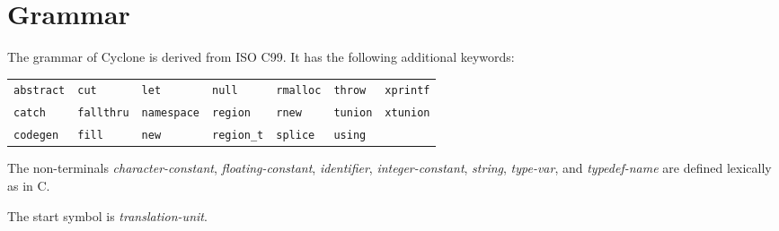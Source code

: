 \section{Grammar}

\newcommand{\rulelabel}[1]{%
  \parbox[b]{\labelwidth}{\makebox[0pt][l]{\hypertarget{#1}{\textit{#1}}:}\\}}
\newenvironment{rules}[1]{%
  \begin{list}{}{}%
    \renewcommand{\makelabel}{\rulelabel}%
  \item[#1]}{\end{list}}
\newcommand{\ruleoneoflabel}[1]{%
  \parbox[b]{\labelwidth}%
  {\makebox[0pt][l]{\hypertarget{#1}{\textit{#1}}: one of}\\}}
\newenvironment{rulesoneof}[1]{%
  \begin{list}{}{}%
    \renewcommand{\makelabel}{\ruleoneoflabel}%
  \item[#1]}{\end{list}}

\newcommand{\nt}[1]{\hyperlink{#1}{\textit{#1}}} %
\newcommand{\tk}[1]{\texttt{#1}}                 %
\newcommand{\opt}{\ensuremath{_{\it\textcolor{bluegray}{opt}}}}

The grammar of Cyclone is derived from ISO C99.
It has the following additional keywords:

\begin{center}
\begin{tabular}{lllllll}
\tk{abstract} &\tk{cut}      &\tk{let}       &\tk{null}     &\tk{rmalloc} &\tk{throw}  &\tk{xprintf}\\
\tk{catch}    &\tk{fallthru} &\tk{namespace} &\tk{region}   &\tk{rnew}    &\tk{tunion} &\tk{xtunion}\\
\tk{codegen}  &\tk{fill}     &\tk{new}       &\tk{region_t} &\tk{splice}  &\tk{using}  
\end{tabular}
\end{center}

The non-terminals
\hypertarget{character-constant}{\textit{character-constant}},
\hypertarget{floating-constant}{\textit{floating-constant}},
\hypertarget{identifier}{\textit{identifier}},
\hypertarget{integer-constant}{\textit{integer-constant}},
\hypertarget{string}{\textit{string}},
\hypertarget{type-var}{\textit{type-var}},
and
\hypertarget{typedef-name}{\textit{typedef-name}}
are defined lexically as in C\@.

The start symbol is \textit{translation-unit}.


